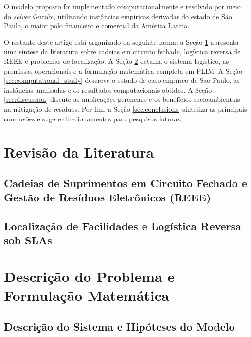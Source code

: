 \documentclass[preprint,12pt,authoryear]{elsarticle}
\begin{document}
O modelo proposto foi implementado computacionalmente e resolvido por meio do \emph{solver} Gurobi, utilizando instâncias empíricas derivadas do estado de São Paulo, o maior polo financeiro e comercial da América Latina.

O restante deste artigo está organizado da seguinte forma: a Seção \ref{sec:lit_review} apresenta uma síntese da literatura sobre cadeias em circuito fechado, logística reversa de REEE e problemas de localização. A Seção \ref{sec:problem_formulation} detalha o sistema logístico, as premissas operacionais e a formulação matemática completa em PLIM. A Seção \ref{sec:computational_study} descreve o estudo de caso empírico de São Paulo, as instâncias analisadas e os resultados computacionais obtidos. A Seção \ref{sec:discussion} discute as implicações gerenciais e os benefícios socioambientais na mitigação de resíduos. Por fim, a Seção \ref{sec:conclusions} sintetiza as principais conclusões e sugere direcionamentos para pesquisas futuras.

\section{Revisão da Literatura}
\label{sec:lit_review}
\subsection{Cadeias de Suprimentos em Circuito Fechado e Gestão de Resíduos Eletrônicos (REEE)}
\lipsum[19-28]

\subsection{Localização de Facilidades e Logística Reversa sob SLAs}
\lipsum[29-38]

\section{Descrição do Problema e Formulação Matemática}
\label{sec:problem_formulation}
\subsection{Descrição do Sistema e Hipóteses do Modelo}
\lipsum[39-48]
\end{document}
